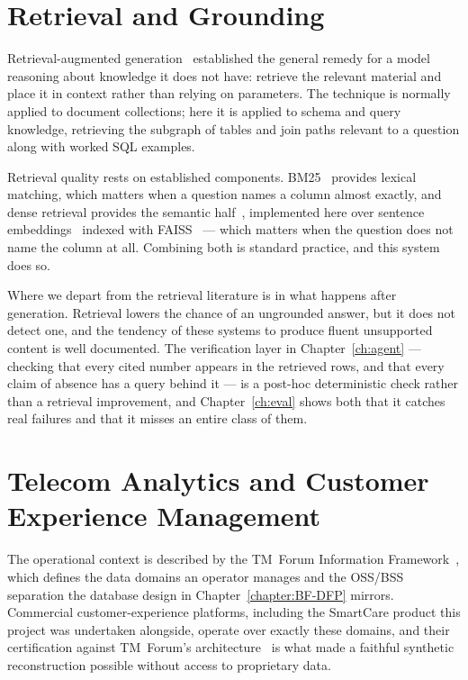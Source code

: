 \section{Retrieval and Grounding}

Retrieval-augmented generation~\cite{rag} established the general remedy for a
model reasoning about knowledge it does not have: retrieve the relevant material
and place it in context rather than relying on parameters. The technique is
normally applied to document collections; here it is applied to schema and query
knowledge, retrieving the subgraph of tables and join paths relevant to a
question along with worked SQL examples.

Retrieval quality rests on established components. BM25~\cite{bm25} provides
lexical matching, which matters when a question names a column almost exactly,
and dense retrieval provides the semantic half~\cite{dpr}, implemented here over
sentence embeddings~\cite{sbert} indexed with FAISS~\cite{faiss} --- which matters
when the question does not name the column at all. Combining both is standard practice, and this system does so.

Where we depart from the retrieval literature is in what happens after
generation. Retrieval lowers the chance of an ungrounded answer, but it does not
detect one, and the tendency of these systems to produce fluent unsupported
content is well documented\cite{hallucination_survey}. The verification layer in Chapter~\ref{ch:agent} --- checking that
every cited number appears in the retrieved rows, and that every claim of absence
has a query behind it --- is a post-hoc deterministic check rather than a
retrieval improvement, and Chapter~\ref{ch:eval} shows both that it catches real
failures and that it misses an entire class of them.

\section{Telecom Analytics and Customer Experience Management}

The operational context is described by the TM~Forum Information
Framework~\cite{tmforum_sid}, which defines the data domains an operator
manages and the OSS/BSS separation the database design in
Chapter~\ref{chapter:BF-DFP} mirrors. Commercial customer-experience platforms,
including the SmartCare product this project was undertaken alongside, operate
over exactly these domains, and their certification against TM~Forum's
architecture~\cite{huawei_tmforum} is what made a faithful synthetic
reconstruction possible without access to proprietary data.

